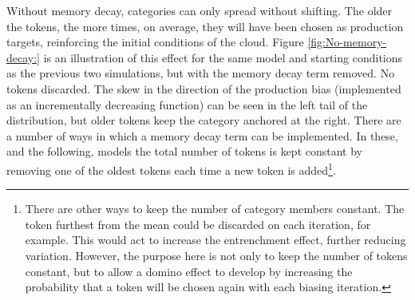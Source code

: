 Without memory decay, categories can only spread without shifting.
The older the tokens, the more times, on average, they will have been
chosen as production targets, reinforcing the initial conditions of
the cloud. Figure \ref{fig:No-memory-decay:} is an illustration of
this effect for the same model and starting conditions as the previous
two simulations, but with the memory decay term removed. No tokens
discarded. The skew in the direction of the production bias (implemented
as an incrementally decreasing function) can be seen in the left tail
of the distribution, but older tokens keep the category anchored at
the right. There are a number of ways in which a memory decay term
can be implemented. In these, and the following, models the total
number of tokens is kept constant by removing one of the oldest tokens
each time a new token is added\footnote{There are other ways to keep the number of category members constant.
The token furthest from the mean could be discarded on each iteration,
for example. This would act to increase the entrenchment effect, further
reducing variation. However, the purpose here is not only to keep
the number of tokens constant, but to allow a domino effect to develop
by increasing the probability that a token will be chosen again with
each biasing iteration. }.

